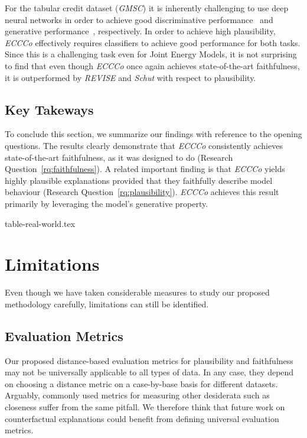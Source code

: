 For the tabular credit dataset (\textit{GMSC}) it is inherently challenging to use deep neural networks in order to achieve good discriminative performance~\citep{borisov2022deep,grinsztajn2022why} and generative performance~\citep{liu2022goggle}, respectively. In order to achieve high plausibility, \textit{ECCCo} effectively requires classifiers to achieve good performance for both tasks. Since this is a challenging task even for Joint Energy Models, it is not surprising to find that even though \textit{ECCCo} once again achieves state-of-the-art faithfulness, it is outperformed by \textit{REVISE} and \textit{Schut} with respect to plausibility.

\subsection{Key Takeways}

To conclude this section, we summarize our findings with reference to the opening questions. The results clearly demonstrate that \textit{ECCCo} consistently achieves state-of-the-art faithfulness, as it was designed to do (Research Question~\ref{rq:faithfulness}). A related important finding is that \textit{ECCCo} yields highly plausible explanations provided that they faithfully describe model behaviour (Research Question~\ref{rq:plausibility}). \textit{ECCCo} achieves this result primarily by leveraging the model's generative property.

{table-real-world.tex}

\section{Limitations}

Even though we have taken considerable measures to study our proposed methodology carefully, limitations can still be identified. 

\subsection{Evaluation Metrics}

Our proposed distance-based evaluation metrics for plausibility and faithfulness may not be universally applicable to all types of data. In any case, they depend on choosing a distance metric on a case-by-base basis for different datasets. Arguably, commonly used metrics for measuring other desiderata such as closeness suffer from the same pitfall. We therefore think that future work on counterfactual explanations could benefit from defining universal evaluation metrics. 

